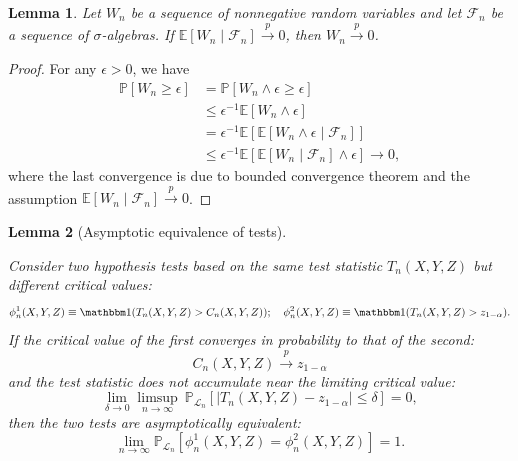 \documentclass[aos]{imsart}
\newtheorem{lemma}{Lemma}
\theoremstyle{definition}
\theoremstyle{remark}
\newcommand{\E}{\mathbb E}								%
\renewcommand{\P}{\mathbb{P}}							%
\newcommand{\indicator}{\mathbbm 1}						%
\newcommand{\convp}{\overset p \rightarrow}             %
\newcommand{\srx}{X}									%
\newcommand{\srz}{Z}									%
\newcommand{\sry}{Y}									%
\newcommand{\law}{\mathcal L}							%
\begin{document}
\begin{lemma}
	\label{lem:conditional-expectation-to-unconditional}
	Let $W_n$ be a sequence of nonnegative random variables and let $\mathcal F_n$ be a sequence of $\sigma$-algebras. If $\E[W_n \mid \mathcal{F}_n]\convp 0$, then $ W_n \convp 0$.
\end{lemma}
\begin{proof}
	For any $\epsilon>0$, we have
	\begin{align}
		\P[W_n \geq \epsilon] &= \P[W_n \wedge \epsilon \geq \epsilon] \\
		&\leq \epsilon^{-1} \E[W_n \wedge \epsilon] \\
		&= \epsilon^{-1} \E[\E[W_n \wedge \epsilon\mid \mathcal{F}_n]]\\
		&\leq \epsilon^{-1} \E[\E[W_n \mid \mathcal{F}_n]\wedge \epsilon] \to 0,
	\end{align}
	where the last convergence is due to bounded convergence theorem and the assumption $\E[W_n \mid \mathcal{F}_n]\convp 0$. 
\end{proof}


\begin{lemma}[Asymptotic equivalence of tests] \label{lem:equivalence-lemma}
	
	Consider two hypothesis tests based on the same test statistic $T_n(\srx, \sry, \srz)$ but different critical values:
	\begin{equation*}
		\phi_n^1(\srx, \sry, \srz) \equiv \indicator(T_n(\srx, \sry, \srz) > C_n(\srx, \sry, \srz)); \quad \phi_n^2(\srx, \sry, \srz) \equiv \indicator(T_n(\srx, \sry, \srz) > z_{1-\alpha}). 
	\end{equation*}
	If the critical value of the first converges in probability to that of the second:
	\begin{equation}
		C_n(\srx, \sry, \srz) \convp z_{1-\alpha}
		\label{eq:convergence-of-critical-value}
	\end{equation}
	and the test statistic does not accumulate near the limiting critical value:
	\begin{equation}
		\lim_{\delta \rightarrow 0}\limsup_{n \rightarrow \infty}\ \P_{\law_n}[|T_n(\srx, \sry, \srz)-z_{1-\alpha}| \leq \delta] = 0,
		\label{eq:non-accumulation-app}
	\end{equation}
	then the two tests are asymptotically equivalent:
	\begin{equation}
		\lim_{n \rightarrow \infty}\P_{\law_n}[\phi_n^{1}(\srx, \sry, \srz) = \phi_n^2(\srx, \sry, \srz)] = 1.
	\end{equation}
\end{lemma}
\end{document}
